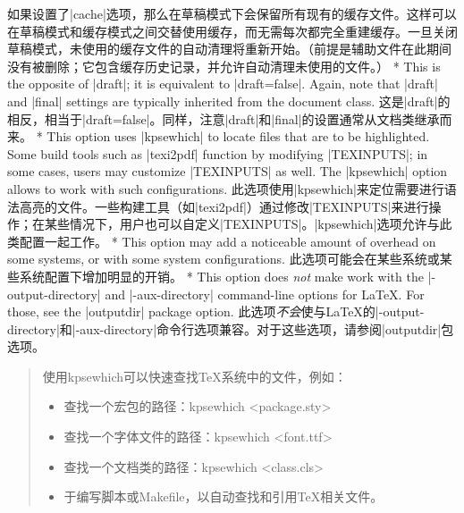 \begin{paracol}{2}
\switchcolumn
如果设置了|cache|选项，那么在草稿模式下会保留所有现有的缓存文件。这样可以在草稿模式和缓存模式之间交替使用缓存，而无需每次都完全重建缓存。一旦关闭草稿模式，未使用的缓存文件的自动清理将重新开始。（前提是辅助文件在此期间没有被删除；它包含缓存历史记录，并允许自动清理未使用的文件。）
\switchcolumn[0]*%
This is the opposite of |draft|; it is equivalent to |draft=false|.  Again, note that |draft| and |final| settings are typically inherited from the document class.
\switchcolumn
{}
这是|draft|的相反，相当于|draft=false|。同样，注意|draft|和|final|的设置通常从文档类继承而来。
\switchcolumn[0]*%
This option uses |kpsewhich| to locate files that are to be highlighted.  Some build tools such as |texi2pdf| function by modifying |TEXINPUTS|; in some cases, users may customize |TEXINPUTS| as well.  The |kpsewhich| option allows  to work with such configurations.
\switchcolumn
{}
此选项使用|kpsewhich|来定位需要进行语法高亮的文件。一些构建工具（如|texi2pdf|）通过修改|TEXINPUTS|来进行操作；在某些情况下，用户也可以自定义|TEXINPUTS|。|kpsewhich|选项允许与此类配置一起工作。
\switchcolumn[0]*%
This option may add a noticeable amount of overhead on some systems, or with some system configurations.
\switchcolumn
此选项可能会在某些系统或某些系统配置下增加明显的开销。
\switchcolumn[0]*%
This option does \emph{not} make  work with the |-output-directory| and |-aux-directory| command-line options for \LaTeX.  For those, see the |outputdir| package option.
\switchcolumn
此选项\emph{不会}使与\LaTeX 的|-output-directory|和|-aux-directory|命令行选项兼容。对于这些选项，请参阅|outputdir|包选项。
\end{paracol}

\begin{quote}
使用kpsewhich可以快速查找TeX系统中的文件，例如：

\begin{multicols}{2}
\begin{itemize}
\item
    查找一个宏包的路径：kpsewhich \textless package.sty\textgreater{}
\item
    查找一个字体文件的路径：kpsewhich \textless font.ttf\textgreater{}
\item
    查找一个文档类的路径：kpsewhich \textless class.cls\textgreater{}
\item 于编写脚本或Makefile，以自动查找和引用TeX相关文件。
\end{itemize}
\end{multicols}
\end{quote}

